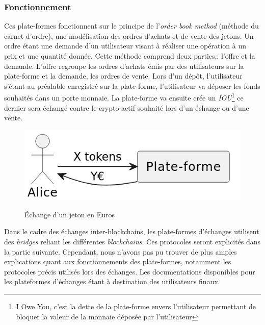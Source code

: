 \subsubsection{Fonctionnement}
Ces plate-formes fonctionnent sur le principe de l'\textit{order book method} (méthode du carnet d'ordre\cite{orderBook}), une modélisation des ordres d'achats et de vente des jetons.
Un ordre étant une demande d'un utilisateur visant à réaliser une opération à un prix et une quantité donnée. 
Cette méthode comprend deux parties,: l'offre et la demande. L'offre regroupe les ordres d'achats émis par des utilisateurs sur la plate-forme et la demande, les ordres de vente.
Lors d'un dépôt, l'utilisateur s'étant au préalable enregistré sur la plate-forme, l'utilisateur va déposer les fonds souhaités dans un porte monnaie. 
La plate-forme va ensuite crée un \textit{IOU}\footnote{I Owe You, c'est la dette de la plate-forme envers l'utilisateur permettant de bloquer la valeur de la monnaie déposée par l'utilisateur\cite{IOU}} 
ce dernier sera échangé contre le crypto-\gls{actif} souhaité lors d'un échange ou d'une vente. \\ 
\begin{figure}[h!]
    \centering
    \includegraphics[scale=0.5]{centralisation/echange.png}
    \label{fig:simplifiedcex}
    \caption{Échange d'un jeton en Euros}
\end{figure}
Dans le cadre des échanges inter-\gls{blockchain}s, les plate-formes d'échanges utilisent des \textit{bridges} reliant les différentes \textit{\gls{blockchain}s}. 
Ces protocoles seront explicités dans la partie suivante.
Cependant, nous n'avons pas pu trouver de plus amples explications quant aux fonctionnements des plate-formes, notamment les protocoles précis utilisés lors des échanges. 
Les documentations disponibles pour les plateformes d'échanges étant à destination des utilisateurs finaux. 


